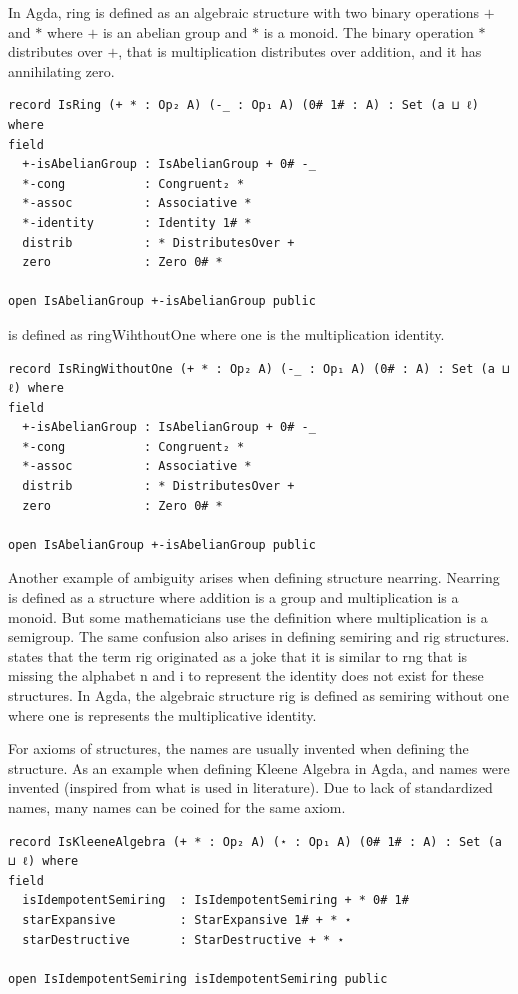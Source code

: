 In Agda, ring is defined as an algebraic structure with two binary operations $+$
and $*$ where $+$ is an abelian group and $*$ is a monoid. The binary operation $*$
distributes over $+$, that is multiplication distributes over addition, and it has
annihilating zero.

\begin{verbatim}
record IsRing (+ * : Op₂ A) (-_ : Op₁ A) (0# 1# : A) : Set (a ⊔ ℓ) where
field
  +-isAbelianGroup : IsAbelianGroup + 0# -_
  *-cong           : Congruent₂ *
  *-assoc          : Associative *
  *-identity       : Identity 1# *
  distrib          : * DistributesOver +
  zero             : Zero 0# *

open IsAbelianGroup +-isAbelianGroup public
\end{verbatim} 
 is defined as ringWihthoutOne where one is the multiplication identity.
\begin{verbatim}
record IsRingWithoutOne (+ * : Op₂ A) (-_ : Op₁ A) (0# : A) : Set (a ⊔ ℓ) where
field
  +-isAbelianGroup : IsAbelianGroup + 0# -_
  *-cong           : Congruent₂ *
  *-assoc          : Associative *
  distrib          : * DistributesOver +
  zero             : Zero 0# *

open IsAbelianGroup +-isAbelianGroup public
\end{verbatim}

Another example of ambiguity arises when defining structure nearring. Nearring
is defined as a structure where addition is a group and multiplication is a
monoid. But some mathematicians use the definition where multiplication is a
semigroup. The same confusion also arises in defining semiring and rig
structures. \cite{enwiki:1133737666} states that the term rig originated as a
joke that it is similar to rng that is missing the alphabet n and i to represent
the identity does not exist for these structures. In Agda, the algebraic
structure rig is defined as semiring without one where one is represents the
multiplicative identity.

For axioms of structures, the names are usually invented when defining the
structure. As an example when defining Kleene Algebra in Agda,
 and  names were invented
(inspired from what is used in literature). Due to lack of standardized names,
many names can be coined for the same axiom.

\begin{verbatim}
record IsKleeneAlgebra (+ * : Op₂ A) (⋆ : Op₁ A) (0# 1# : A) : Set (a ⊔ ℓ) where
field
  isIdempotentSemiring  : IsIdempotentSemiring + * 0# 1#
  starExpansive         : StarExpansive 1# + * ⋆
  starDestructive       : StarDestructive + * ⋆

open IsIdempotentSemiring isIdempotentSemiring public
\end{verbatim} 

